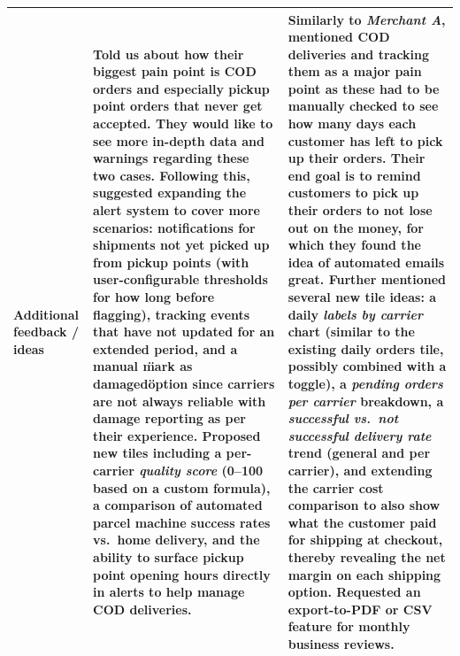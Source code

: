 \documentclass{imc-inf}
\begin{document}
\begin{longtable}{@{}>{\raggedright\arraybackslash}p{3cm}p{5.75cm}p{5.75cm}@{}}
  \textbf{Additional feedback / ideas}                                                                                                                                                                                                                                                                                                                                                                                                                                                                                                                                                                                                                                                                                                                                                                                                                                                                         &
  Told us about how their biggest pain point is COD orders and especially pickup point orders that never get accepted. They would like to see more in-depth data and warnings regarding these two cases. Following this, suggested expanding the alert system to cover more scenarios: notifications for shipments not yet picked up from pickup points (with user-configurable thresholds for how long before flagging), tracking events that have not updated for an extended period, and a manual \"mark as damaged\" option since carriers are not always reliable with damage reporting as per their experience. Proposed new tiles including a per-carrier \textit{quality score} (0--100 based on a custom formula), a comparison of automated parcel machine success rates vs.\ home delivery, and the ability to surface pickup point opening hours directly in alerts to help manage COD deliveries. &
  Similarly to \textit{Merchant A}, mentioned COD deliveries and tracking them as a major pain point as these had to be manually checked to see how many days each customer has left to pick up their orders. Their end goal is to remind customers to pick up their orders to not lose out on the money, for which they found the idea of automated emails great. Further mentioned several new tile ideas: a daily \textit{labels by carrier} chart (similar to the existing daily orders tile, possibly combined with a toggle), a \textit{pending orders per carrier} breakdown, a \textit{successful vs.\ not successful delivery rate} trend (general and per carrier), and extending the carrier cost comparison to also show what the customer paid for shipping at checkout, thereby revealing the net margin on each shipping option. Requested an export-to-PDF or CSV feature for monthly business reviews.                                    \\[6pt]

  \bottomrule
\end{longtable}
\end{document}
